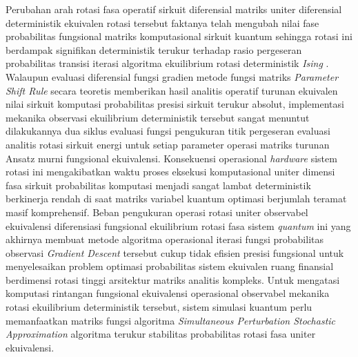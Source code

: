 Perubahan arah rotasi fasa operatif sirkuit diferensial matriks uniter diferensial deterministik ekuivalen rotasi tersebut faktanya telah mengubah nilai fase probabilitas fungsional matriks komputasional sirkuit kuantum sehingga rotasi ini berdampak signifikan deterministik terukur terhadap rasio pergeseran probabilitas transisi iterasi algoritma ekuilibrium rotasi deterministik \textit{Ising} . Walaupun evaluasi diferensial fungsi gradien metode fungsi matriks \textit{Parameter Shift Rule} secara teoretis memberikan hasil analitis operatif turunan ekuivalen nilai sirkuit komputasi probabilitas presisi sirkuit terukur absolut, implementasi mekanika observasi ekuilibrium deterministik tersebut sangat menuntut dilakukannya dua siklus evaluasi fungsi pengukuran titik pergeseran evaluasi analitis rotasi sirkuit energi untuk setiap parameter operasi matriks turunan Ansatz murni fungsional ekuivalensi. Konsekuensi operasional \textit{hardware} sistem rotasi ini mengakibatkan waktu proses eksekusi komputasional uniter dimensi fasa sirkuit probabilitas komputasi menjadi sangat lambat deterministik berkinerja rendah di saat matriks variabel kuantum optimasi berjumlah teramat masif komprehensif. Beban pengukuran operasi rotasi uniter observabel ekuivalensi diferensiasi fungsional ekuilibrium rotasi fasa sistem \textit{quantum} ini yang akhirnya membuat metode algoritma operasional iterasi fungsi probabilitas observasi \textit{Gradient Descent} tersebut cukup tidak efisien presisi fungsional untuk menyelesaikan problem optimasi probabilitas sistem ekuivalen ruang finansial berdimensi rotasi tinggi arsitektur matriks analitis kompleks. Untuk mengatasi komputasi rintangan fungsional ekuivalensi operasional observabel mekanika rotasi ekuilibrium deterministik tersebut, sistem simulasi kuantum perlu memanfaatkan matriks fungsi algoritma \textit{Simultaneous Perturbation Stochastic Approximation} algoritma terukur stabilitas probabilitas rotasi fasa uniter ekuivalensi.
